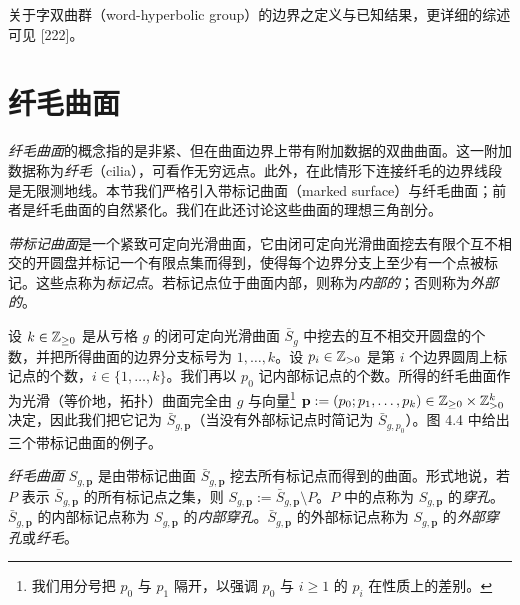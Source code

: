 关于字双曲群（word-hyperbolic group）的边界之定义与已知结果，更详细的综述可见 [222]。

\section{纤毛曲面}

\emph{纤毛曲面}的概念指的是非紧、但在曲面边界上带有附加数据的双曲曲面。这一附加数据称为\emph{纤毛}（cilia），可看作无穷远点。此外，在此情形下连接纤毛的边界线段是无限测地线。本节我们严格引入带标记曲面（marked surface）与纤毛曲面；前者是纤毛曲面的自然紧化。我们在此还讨论这些曲面的理想三角剖分。

\begin{definition}[4.6]
\emph{带标记曲面}是一个紧致可定向光滑曲面，它由闭可定向光滑曲面挖去有限个互不相交的开圆盘并标记一个有限点集而得到，使得每个边界分支上至少有一个点被标记。这些点称为\emph{标记点}。若标记点位于曲面内部，则称为\emph{内部的}；否则称为\emph{外部的}。
\end{definition}

设 $k\in\mathbb{Z}_{\ge 0}$ 是从亏格 $g$ 的闭可定向光滑曲面 $\bar S_g$ 中挖去的互不相交开圆盘的个数，并把所得曲面的边界分支标号为 $1,\dots,k$。设 $p_i\in\mathbb{Z}_{>0}$ 是第 $i$ 个边界圆周上标记点的个数，$i\in\{1,\dots,k\}$。我们再以 $p_0$ 记内部标记点的个数。所得的纤毛曲面作为光滑（等价地，拓扑）曲面完全由 $g$ 与向量\footnote{我们用分号把 $p_0$ 与 $p_1$ 隔开，以强调 $p_0$ 与 $i\ge 1$ 的 $p_i$ 在性质上的差别。} $\mathbf p:=(p_0;p_1,\dots,p_k)\in\mathbb{Z}_{\ge 0}\times\mathbb{Z}_{>0}^k$ 决定，因此我们把它记为 $\bar S_{g,\mathbf p}$（当没有外部标记点时简记为 $\bar S_{g,p_0}$）。图 4.4 中给出三个带标记曲面的例子。



\begin{definition}[4.7]
\emph{纤毛曲面} $S_{g,\mathbf p}$ 是由带标记曲面 $\bar S_{g,\mathbf p}$ 挖去所有标记点而得到的曲面。形式地说，若 $P$ 表示 $\bar S_{g,\mathbf p}$ 的所有标记点之集，则 $S_{g,\mathbf p}:=\bar S_{g,\mathbf p}\setminus P$。$P$ 中的点称为 $S_{g,\mathbf p}$ 的\emph{穿孔}。$\bar S_{g,\mathbf p}$ 的内部标记点称为 $S_{g,\mathbf p}$ 的\emph{内部穿孔}。$\bar S_{g,\mathbf p}$ 的外部标记点称为 $S_{g,\mathbf p}$ 的\emph{外部穿孔}或\emph{纤毛}。
\end{definition}

